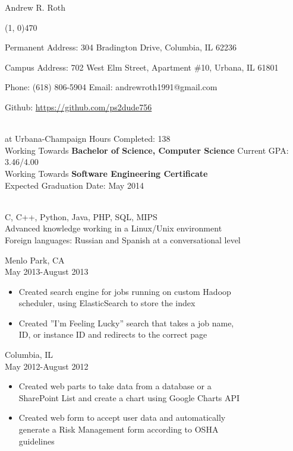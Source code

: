 \documentclass[11pt]{article}
\begin{document}
  \centerline{{\Huge \sc Andrew R. Roth}}
  \noindent\line(1, 0){470}\\
  \centerline{
    Permanent Address:
      304 Bradington Drive,
      Columbia,
      IL 62236
  }
  \centerline{
    Campus Address:
      702 West Elm Street,
      Apartment \#10,
      Urbana,
      IL 61801
  }
  \centerline{
    Phone: (618) 806-5904
    \indent Email: andrewroth1991@gmail.com
  }
  \centerline{
    Github: \url{https://github.com/ps2dude756}
  }

  \bigskip

  \\
     at Urbana-Champaign \hfill 
      Hours Completed: 138\\
    \indent Working Towards {\bf Bachelor of Science, Computer Science} \hfill 
      Current GPA: 3.46/4.00\\
    \indent Working Towards {\bf Software Engineering Certificate}\\
    \indent Expected Graduation Date: May 2014

  \bigskip

  \\
    \indent C, C++, Python, Java, PHP, SQL, MIPS\\
    \indent Advanced knowledge working in a Linux/Unix environment\\
    \indent Foreign languages: Russian and Spanish at a conversational level

  \bigskip

    \smallskip

     \hfill Menlo Park, CA\\
     \hfill May 2013-August 2013
    \begin{itemize}[noitemsep,topsep=0pt,leftmargin=52pt]
      \item Created search engine for jobs running on custom Hadoop\\
        scheduler, using ElasticSearch to store the index
      \item Created ''I'm Feeling Lucky'' search that takes a job name,\\
        ID, or instance ID and redirects to the correct page
    \end{itemize}
    \medskip

     \hfill Columbia, IL\\
     \hfill May 2012-August 2012
    \begin{itemize}[noitemsep,topsep=0pt,leftmargin=52pt]
      \item Created web parts to take data from a database or a\\
        SharePoint List and create a chart using Google Charts API
      \item Created web form to accept user data and automatically\\
        generate a Risk Management form according to OSHA\\
        guidelines
    \end{itemize}
    \medskip
\end{document}
